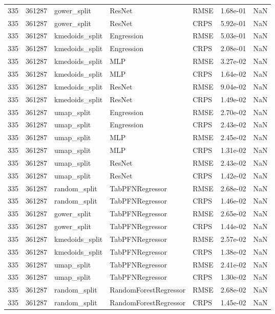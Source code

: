 \begin{tabular}{rrlllrr}
335 & 361287 & gower\_split & ResNet & RMSE & 1.68e-01 & NaN \\
335 & 361287 & gower\_split & ResNet & CRPS & 5.92e-01 & NaN \\
335 & 361287 & kmedoids\_split & Engression & RMSE & 5.03e-01 & NaN \\
335 & 361287 & kmedoids\_split & Engression & CRPS & 2.08e-01 & NaN \\
335 & 361287 & kmedoids\_split & MLP & RMSE & 3.27e-02 & NaN \\
335 & 361287 & kmedoids\_split & MLP & CRPS & 1.64e-02 & NaN \\
335 & 361287 & kmedoids\_split & ResNet & RMSE & 9.04e-02 & NaN \\
335 & 361287 & kmedoids\_split & ResNet & CRPS & 1.49e-02 & NaN \\
335 & 361287 & umap\_split & Engression & RMSE & 2.70e-02 & NaN \\
335 & 361287 & umap\_split & Engression & CRPS & 2.43e-02 & NaN \\
335 & 361287 & umap\_split & MLP & RMSE & 2.45e-02 & NaN \\
335 & 361287 & umap\_split & MLP & CRPS & 1.31e-02 & NaN \\
335 & 361287 & umap\_split & ResNet & RMSE & 2.43e-02 & NaN \\
335 & 361287 & umap\_split & ResNet & CRPS & 1.42e-02 & NaN \\
335 & 361287 & random\_split & TabPFNRegressor & RMSE & 2.68e-02 & NaN \\
335 & 361287 & random\_split & TabPFNRegressor & CRPS & 1.46e-02 & NaN \\
335 & 361287 & gower\_split & TabPFNRegressor & RMSE & 2.65e-02 & NaN \\
335 & 361287 & gower\_split & TabPFNRegressor & CRPS & 1.44e-02 & NaN \\
335 & 361287 & kmedoids\_split & TabPFNRegressor & RMSE & 2.57e-02 & NaN \\
335 & 361287 & kmedoids\_split & TabPFNRegressor & CRPS & 1.38e-02 & NaN \\
335 & 361287 & umap\_split & TabPFNRegressor & RMSE & 2.41e-02 & NaN \\
335 & 361287 & umap\_split & TabPFNRegressor & CRPS & 1.30e-02 & NaN \\
335 & 361287 & random\_split & RandomForestRegressor & RMSE & 2.68e-02 & NaN \\
335 & 361287 & random\_split & RandomForestRegressor & CRPS & 1.45e-02 & NaN \\

\end{tabular}
